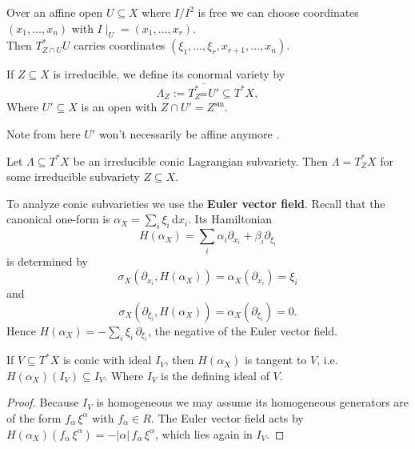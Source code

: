 \label{prop:conormal_bundle_in_local_coordinate}
Over an affine open $U\subseteq X$
where $I/I^2$ is free we can choose coordinates $(x_1,\dots,x_n)$ with
$I\mid_U=(x_1,\dots,x_r)$. \\
Then $T^\ast_{Z\cap U} U$ carries coordinates
$(\xi_1,\dots,\xi_r,x_{r+1},\dots,x_n)$.

If $Z\subseteq X$ is irreducible, we define its conormal variety by
\[
    \Lambda_Z := \overline{T^\ast_{Z^{\mathrm{sm}}} U'} \subseteq T^\ast X,
\]
Where $U'\subseteq X$ is an open with $Z\cap U'=Z^{\mathrm{sm}}$.

\begin{remark}
    Note from here $U'$ won't necessarily be affine anymore \cite[\href{https://stacks.math.columbia.edu/tag/01LL}{Tag 01LL}]{stacks-project}.
\end{remark}

\begin{theorem}\label{thm:conic-lagrangian}
    Let $\Lambda\subseteq T^\ast X$ be an irreducible conic Lagrangian subvariety.
    Then $\Lambda=T^\ast_Z X$ for some irreducible subvariety $Z\subseteq X$.
\end{theorem}

To analyze conic subvarieties we use the \textbf{Euler vector field}.  Recall that the
canonical one-form is $\alpha_X=\sum_i \xi_i\,\text{d}x_i$.  Its Hamiltonian
\[
    H(\alpha_X)=\sum_i \alpha_i\partial_{x_i}+\beta_i\partial_{\xi_i}
\]
is determined by
\[
    \sigma_X(\partial_{x_i},H(\alpha_X))=\alpha_X(\partial_{x_i})
    =\xi_i
\]
and
\[
    \sigma_X(\partial_{\xi_i},H(\alpha_X))=\alpha_X(\partial_{\xi_i})
    =0.
\]
Hence $H(\alpha_X)=-\sum_i \xi_i\,\partial_{\xi_i}$, the negative of the
Euler vector field.

\begin{lemma}\label{lem:tangent_vector}
    If $V\subseteq T^\ast X$ is conic with ideal $I_V$, then $H(\alpha_X)$ is
    tangent to $V$, i.e.\ $H(\alpha_X)(I_V)\subseteq I_V$. Where $I_V$ is the defining ideal of $V$.
\end{lemma}
\begin{proof}
    Because $I_V$ is homogeneous we may assume its homogeneous generators are of the form
    $f_\alpha\,\xi^\alpha$ with $f_\alpha\in R$.  The Euler vector field acts by
    $H(\alpha_X)(f_\alpha\,\xi^\alpha)=-|\alpha|\,f_\alpha\,\xi^\alpha$, which lies
    again in $I_V$.
\end{proof}

